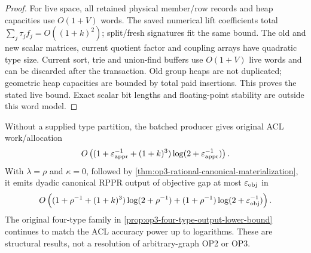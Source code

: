 \begin{proof}
For live space, all retained physical member/row records and heap
capacities use $O(1+V)$ words. The saved numerical lift coefficients total
$\sum_j\tau_j f_j=O((1+k)^2)$; split/fresh signatures fit the same
bound. The old and new scalar matrices, current quotient factor and
coupling arrays have quadratic type size. Current sort, trie and union-find
buffers use $O(1+V)$ live words and can be discarded after the transaction.
Old group heaps are not duplicated; geometric heap capacities are bounded
by total paid insertions. This proves the stated live bound. Exact scalar
bit lengths and floating-point stability are outside this word model.
\end{proof}

\begin{corollary}
\label{cor:op3-batch-type-canonical}
Without a supplied type partition, the batched producer gives original ACL
work/allocation
\[
 O\left((1+\varepsilon_{\mathrm{appr}}^{-1}+(1+k)^3)\log(2+\varepsilon_{\mathrm{appr}}^{-1})\right).
\]
With $\lambda=\rho$ and $\kappa=0$, followed by
\cref{thm:op3-rational-canonical-materialization}, it emits dyadic canonical
RPPR output of objective gap at most $\varepsilon_{\mathrm{obj}}$ in
\[
 O\left((1+\rho^{-1}+(1+k)^3)\log(2+\rho^{-1})
       +(1+\rho^{-1})\log(2+\varepsilon_{\mathrm{obj}}^{-1})\right).
\]
The original four-type family in \cref{prop:op3-four-type-output-lower-bound}
continues to match the ACL accuracy power up to logarithms. These are
structural results, not a resolution of arbitrary-graph OP2 or OP3.
\end{corollary}

